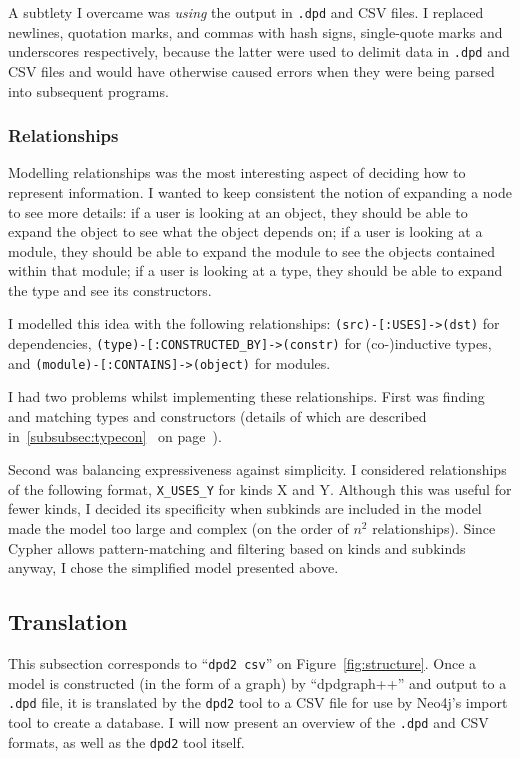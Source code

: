 A subtlety I overcame was \emph{using} the output in \texttt{.dpd} and CSV
files. I replaced newlines, quotation marks, and commas with hash signs,
single-quote marks and underscores respectively, because the latter were used to
delimit data in \texttt{.dpd} and CSV files and would have otherwise caused
errors when they were being parsed into subsequent programs.

\subsubsection{Relationships}

Modelling relationships was the most interesting aspect of deciding how to
represent information. I wanted to keep consistent the notion of expanding a
node to see more details: if a user is looking at an object, they should be able
to expand the object to see what the object depends on; if a user is looking at
a module, they should be able to expand the module to see the objects contained
within that module; if a user is looking at a type, they should
be able to expand the type and see its constructors.

I modelled this idea with the following relationships:
\texttt{(src)-[:USES]->(dst)} for dependencies,
\texttt{(type)-[:CONSTRUCTED_BY]->(constr)} for (co-)inductive
types, and \texttt{(module)-[:CONTAINS]->(object)} for modules.

I had two problems whilst implementing these relationships. First was finding
and matching types and constructors (details of which are described
in~\ref{subsubsec:typecon}~ on
page~\pageref{subsubsec:typecon}).

Second was balancing expressiveness against simplicity. I considered
relationships of the following format, \texttt{X\_USES\_Y} for kinds X and Y.
Although this was useful for fewer kinds, I decided its specificity when
subkinds are included in the model made the model too large and complex (on the
order of $n^{2}$ relationships). Since Cypher allows pattern-matching and
filtering based on kinds and subkinds anyway, I chose the simplified model
presented above.

\subsection{Translation}\label{subsec:translation}

This subsection corresponds to ``\texttt{dpd2 csv}'' on
Figure~\ref{fig:structure}.  Once a model is constructed (in the form of a
graph) by ``dpdgraph++'' and output to a \texttt{.dpd} file, it is translated by
the \texttt{dpd2} tool to a CSV file for use by Neo4j's import tool to create a
database. I will now present an overview of the \texttt{.dpd} and CSV formats,
as well as the \texttt{dpd2} tool itself.

